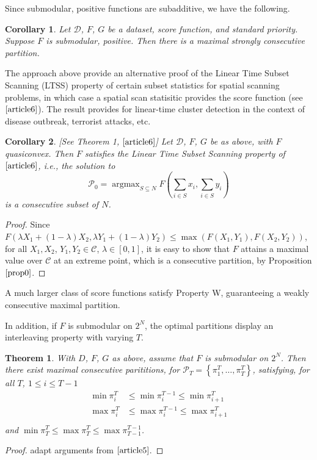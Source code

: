 \documentclass{article}
\newtheorem{thm}{Theorem}
\newtheorem{corollary}{Corollary}
\theoremstyle{case}
\DeclareMathOperator*{\argmax}{argmax} %
\begin{document}
Since submodular, positive functions are subadditive, we have the following.

\begin{corollary} \label{cor0}
Let $\mathcal{D}$, $F$, $G$ be a dataset, score function, and standard priority. Suppose $F$ is submodular, positive. Then there is a maximal strongly consecutive partition.
\end{corollary}

The approach above provide an alternative proof of the Linear Time Subset Scanning (LTSS) property of certain subset statistics for spatial scanning problems, in which case a spatial scan statisitic provides the score function (see $\cite{article6}$). The result provides for linear-time cluster detection in the context of disease outbreak, terrorist attacks, etc.

\begin{corollary} \label{cor1}
[See Theorem 1, $\cite{article6}$] Let $\mathcal{D}$, $F$, $G$ be as above, with $F$ quasiconvex. Then $F$ satisfies the Linear Time Subset Scanning property of $\cite{article6}$, i.e., the solution to
\[
\mathcal{P_0} = \argmax_{S \subseteq N} F(\sum_{i \in S}x_i, \sum_{i \in S}y_i)
\]
is a consecutive subset of $N$.
\end{corollary}
\begin{proof}
Since $F(\lambda X_1 + \left( 1 - \lambda\right)X_2, \lambda Y_1 + \left( 1 - \lambda\right) Y_2) \leq \max{\left(F(X_1, Y_1), F(X_2, Y_2)\right)}$, for all $X_1, X_2$, $Y_1, Y_2 \in \mathcal{C}$, $\lambda \in \left[ 0,1\right]$, it is easy to show that $F$ attains a maximal value over $\mathcal{C}$ at an extreme point, which is a consecutive partition, by Proposition $\cite{prop0}$.
\end{proof}

A much larger class of score functions satisfy Property W, guaranteeing a weakly consecutive maximal partition.


In addition, if $F$ is submodular on $2^N$, the optimal partitions display an interleaving property with varying $T$.
\begin{thm} \label{thm2}
With $D$, $F$, $G$ as above, assume that $F$ is submodular on $2^N$. Then there exist maximal consecutive parititions, for $\mathcal{P}_T = \left\lbrace \pi_1^T, \dots, \pi_T^T\right\rbrace$, satisfying, for all $T$, $1 \leq i \leq T-1$
\begin{align*}
\min{\pi_i^T} &\leq \min{\pi_i^{T-1}} \leq \min{\pi_{i+1}^T} \\
\max{\pi_i^T} &\leq \max{\pi_i^{T-1}} \leq \max{\pi_{i+1}^T} \\
\end{align*}
and $\min{\pi_T^T} \leq \max{\pi_T^T} \leq \max{\pi_{T-1}^{T-1}}$.
\end{thm}
\begin{proof}
adapt arguments from $\cite{article5}$.
\end{proof}
\end{document}
